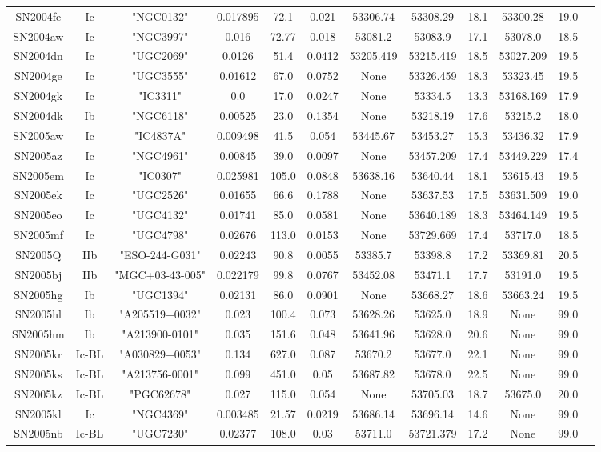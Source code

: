 \documentclass[onecolumn]{aa} %
\begin{document}
\begin{table*}
\begin{tabular}{cccccccccccc}
SN2004fe&Ic&"NGC0132"&0.017895&72.1&0.021&53306.74&53308.29&18.1&53300.28&19.0\\ 
SN2004aw&Ic&"NGC3997"&0.016&72.77&0.018&53081.2&53083.9&17.1&53078.0&18.5\\ 
SN2004dn&Ic&"UGC2069"&0.0126&51.4&0.0412&53205.419&53215.419&18.5&53027.209&19.5\\ 
SN2004ge&Ic&"UGC3555"&0.01612&67.0&0.0752&None&53326.459&18.3&53323.45&19.5\\ 
SN2004gk&Ic&"IC3311"&0.0&17.0&0.0247&None&53334.5&13.3&53168.169&17.9\\ 
SN2004dk&Ib&"NGC6118"&0.00525&23.0&0.1354&None&53218.19&17.6&53215.2&18.0\\ 
SN2005aw&Ic&"IC4837A"&0.009498&41.5&0.054&53445.67&53453.27&15.3&53436.32&17.9\\ 
SN2005az&Ic&"NGC4961"&0.00845&39.0&0.0097&None&53457.209&17.4&53449.229&17.4\\ 
SN2005em&Ic&"IC0307"&0.025981&105.0&0.0848&53638.16&53640.44&18.1&53615.43&19.5\\ 
SN2005ek&Ic&"UGC2526"&0.01655&66.6&0.1788&None&53637.53&17.5&53631.509&19.0\\ 
SN2005eo&Ic&"UGC4132"&0.01741&85.0&0.0581&None&53640.189&18.3&53464.149&19.5\\ 
SN2005mf&Ic&"UGC4798"&0.02676&113.0&0.0153&None&53729.669&17.4&53717.0&18.5\\ 
SN2005Q&IIb&"ESO-244-G031"&0.02243&90.8&0.0055&53385.7&53398.8&17.2&53369.81&20.5\\ 
SN2005bj&IIb&"MGC+03-43-005"&0.022179&99.8&0.0767&53452.08&53471.1&17.7&53191.0&19.5\\ 
SN2005hg&Ib&"UGC1394"&0.02131&86.0&0.0901&None&53668.27&18.6&53663.24&19.5\\ 
SN2005hl&Ib&"A205519+0032"&0.023&100.4&0.073&53628.26&53625.0&18.9&None&99.0\\ 
SN2005hm&Ib&"A213900-0101"&0.035&151.6&0.048&53641.96&53628.0&20.6&None&99.0\\ 
SN2005kr&Ic-BL&"A030829+0053"&0.134&627.0&0.087&53670.2&53677.0&22.1&None&99.0\\ 
SN2005ks&Ic-BL&"A213756-0001"&0.099&451.0&0.05&53687.82&53678.0&22.5&None&99.0\\ 
SN2005kz&Ic-BL&"PGC62678"&0.027&115.0&0.054&None&53705.03&18.7&53675.0&20.0\\ 
SN2005kl&Ic&"NGC4369"&0.003485&21.57&0.0219&53686.14&53696.14&14.6&None&99.0\\ 
SN2005nb&Ic-BL&"UGC7230"&0.02377&108.0&0.03&53711.0&53721.379&17.2&None&99.0\\ 

\end{tabular}
\end{table*}
\end{document}
